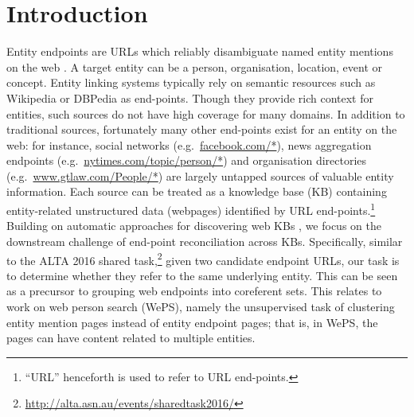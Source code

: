 \documentclass[letterpaper]{sig-alternate-2013}
\begin{document}

\section{Introduction}


Entity endpoints are URLs which reliably disambiguate named entity mentions on the web \cite{chisholm2016akbc}. A target entity can be a person, organisation, location, event or concept. Entity linking systems typically rely on semantic resources such as Wikipedia or DBPedia as end-points. Though they provide rich context for entities, such sources do not have high coverage for many domains. In addition to traditional sources, fortunately many other end-points exist for an entity on the web: for instance,  social networks (e.g.\ \url{facebook.com/*}), news aggregation endpoints (e.g.\ \url{nytimes.com/topic/person/*}) and organisation directories (e.g.\ \url{www.gtlaw.com/People/*}) are largely untapped  sources of valuable entity information. Each source can be treated as a knowledge base (KB) containing entity-related unstructured data (webpages) identified by URL end-points.\footnote{``URL'' henceforth is used to refer to URL end-points.} Building on automatic approaches for discovering web KBs \cite{chisholm2016akbc}, we focus on the downstream challenge of end-point reconciliation across KBs. Specifically, similar to the ALTA 2016 shared task,\footnote{\url{http://alta.asn.au/events/sharedtask2016/}} given two candidate endpoint URLs, our task is to determine whether they refer to the same underlying entity. This can be seen as a precursor to grouping web endpoints into coreferent sets. This relates to work on web person search (WePS), namely the unsupervised task of clustering entity mention pages instead of entity endpoint pages; that is, in WePS, the pages can have content related to multiple entities.
\end{document}
